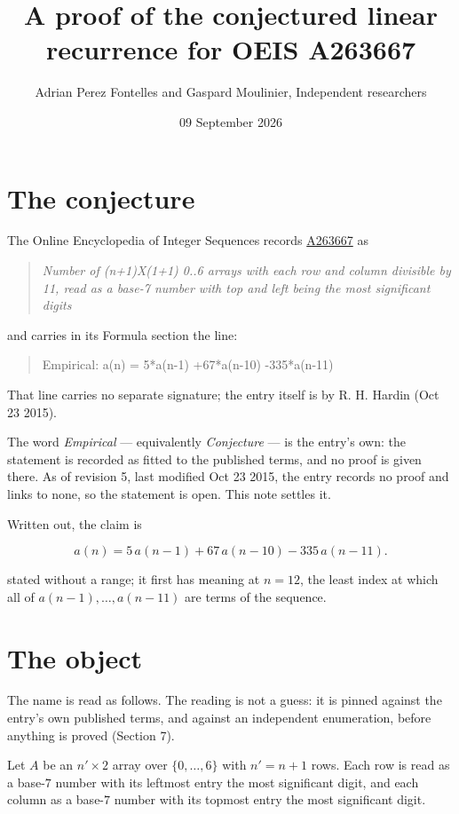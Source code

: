 \documentclass[11pt]{article}
\title{A proof of the conjectured linear recurrence for OEIS A263667}
\author{Adrian Perez Fontelles and Gaspard Moulinier, Independent researchers}
\date{09 September 2026}
\theoremstyle{definition}
\begin{document}
\maketitle
\section{The conjecture}

The Online Encyclopedia of Integer Sequences records \href{https://oeis.org/A263667}{A263667} as

\begin{quote}\itshape Number of (n+1)X(1+1) 0..6 arrays with each row and column divisible by 11, read as a base-7 number with top and left being the most significant digits\end{quote}

and carries in its Formula section the line:

\begin{quote}\ttfamily Empirical: a(n) = 5*a(n-1) +67*a(n-10) -335*a(n-11)\end{quote}

That line carries no separate signature; the entry itself is by R. H. Hardin (Oct 23 2015).

The word {\itshape Empirical} --- equivalently {\itshape Conjecture} --- is the entry's own: the statement is recorded as fitted to the published terms, and no proof is given there. As of revision 5, last modified Oct 23 2015, the entry records no proof and links to none, so the statement is open. This note settles it.

Written out, the claim is

\[a(n) = 5\,a(n-1) + 67\,a(n-10) - 335\,a(n-11).\]

stated without a range; it first has meaning at $n = 12$, the least index at which all of $a(n-1),\dots,a(n-11)$ are terms of the sequence.

\section{The object}

The name is read as follows. The reading is not a guess: it is pinned against the entry's own published terms, and against an independent enumeration, before anything is proved (Section 7).

Let $A$ be an $n' \times 2$ array over $\{0,\dots,6\}$ with $n' = n + 1$ rows. Each row is read as a base-$7$ number with its leftmost entry the most significant digit, and each column as a base-$7$ number with its topmost entry the most significant digit.
\end{document}
